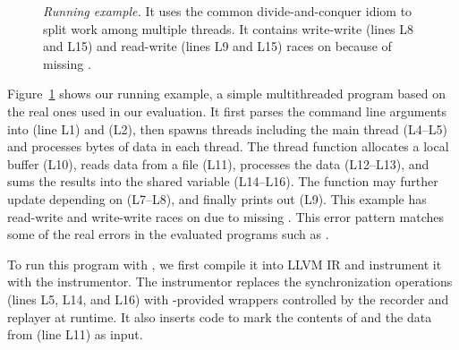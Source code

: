 \begin{figure}[t]
\centering
\begin{minipage}{.5\textwidth}
\end{minipage}
\caption{{\em Running example.} It uses the common
  divide-and-conquer idiom to split work among multiple threads.
  It contains write-write (lines L8 and L15)
  and read-write (lines L9 and L15) races on  because
  of missing .} \label{fig:peregrine-example}
\end{figure}

Figure~\ref{fig:peregrine-example} shows our running example, a simple multithreaded
program based on the real ones used in our evaluation.  It first parses
the command line arguments into  (line L1) and  (L2),
then spawns  threads including the main thread (L4--L5) and
processes  bytes of data in each thread.  The thread
function  allocates a local buffer (L10), reads data from a
file (L11), processes the data (L12--L13), and sums the results into
the shared variable  (L14--L16).  The  function may
further update  depending on  (L7--L8), and finally
prints out  (L9).  This example has read-write and write-write
races on  due to missing .  This error
pattern matches some of the real errors in the evaluated programs such as
\pbzip.

 To run this
program with \peregrine, we first compile it into LLVM IR and instrument it with
the instrumentor.  The instrumentor replaces the synchronization
operations (lines L5, L14, and L16) with \peregrine-provided wrappers controlled by
the recorder and replayer at runtime.  It also inserts code to mark 
the contents of  and the data from  (line L11) as
input.


